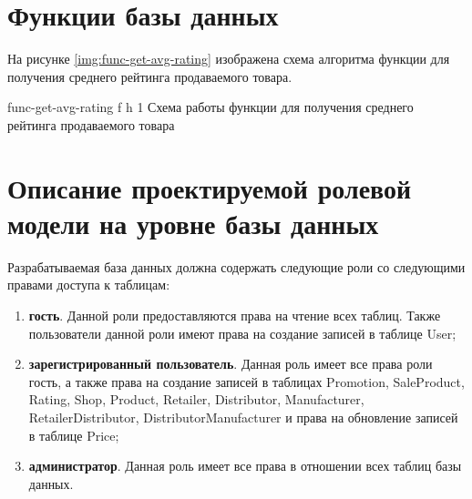 \clearpage

\section{Функции базы данных}

На рисунке \ref{img:func-get-avg-rating} изображена схема алгоритма  функции для получения среднего рейтинга продаваемого товара.

{func-get-avg-rating} %
{f} %
{h} %
{1\textwidth} %
{Схема работы функции для получения среднего рейтинга продаваемого товара} %

\clearpage

\section{Описание проектируемой ролевой модели на уровне базы данных}

Разрабатываемая база данных должна содержать следующие роли со следующими правами доступа к таблицам:

\begin{enumerate}
	\item \textbf{гость}. Данной роли предоставляются права на чтение всех таблиц. Также пользователи данной роли имеют права на создание записей в таблице User;
	\item \textbf{зарегистрированный пользователь}. Данная роль имеет все права роли гость, а также права на создание записей в таблицах Promotion, SaleProduct, Rating, Shop, Product, Retailer, Distributor, Manufacturer, RetailerDistributor, DistributorManufacturer и права на обновление записей в таблице Price;
	\item \textbf{администратор}. Данная роль имеет все права в отношении всех таблиц базы данных.
\end{enumerate}


